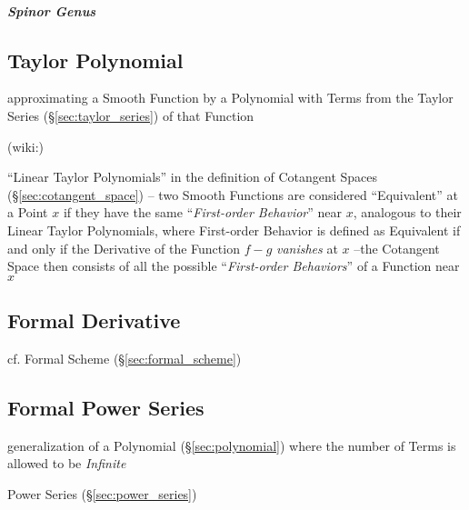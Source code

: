 \subparagraph{Spinor Genus}\label{sec:spinor_genus}\hfill



\subsection{Taylor Polynomial}\label{sec:taylor_polynomial}

approximating a Smooth Function by a Polynomial with Terms from the
Taylor Series (\S\ref{sec:taylor_series}) of that Function

(wiki:)

``Linear Taylor Polynomials'' in the definition of Cotangent Spaces
(\S\ref{sec:cotangent_space}) -- two Smooth Functions are considered
``Equivalent'' at a Point $x$ if they have the same ``\emph{First-order
  Behavior}'' near $x$, analogous to their Linear Taylor Polynomials,
where First-order Behavior is defined as Equivalent if and only if the
Derivative of the Function $f-g$ \emph{vanishes} at $x$ --the Cotangent Space
then consists of all the possible ``\emph{First-order Behaviors}'' of a
Function near $x$



\subsection{Formal Derivative}\label{sec:formal_derivative}


cf. Formal Scheme (\S\ref{sec:formal_scheme})



\subsection{Formal Power Series}\label{sec:formal_power_series}

generalization of a Polynomial (\S\ref{sec:polynomial}) where the number of
Terms is allowed to be \emph{Infinite}

\fist Power Series (\S\ref{sec:power_series})

